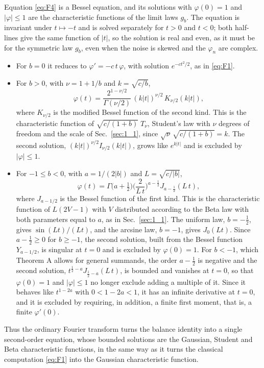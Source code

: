 \documentclass[aip,jmp,preprint,onecolumn,floatfix,superscriptaddress,nofootinbib,11pt]{revtex4-2}
\theoremstyle{plain}
\theoremstyle{remark}
\numberwithin{equation}{section}
\begin{document}
Equation \eqref{eq:F4} is a Bessel equation, and its solutions with $\varphi(0)=1$ and $|\varphi|\le1$ are the characteristic functions of the limit laws $g_b$. The equation is invariant under $t\mapsto-t$ and is solved separately for $t>0$ and $t<0$; both half-lines give the same function of $|t|$, so the solution is real and even, as it must be for the symmetric law $g_b$, even when the noise is skewed and the $\varphi_n$ are complex.
\begin{itemize}
\item For $b=0$ it reduces to $\varphi'=-c\,t\,\varphi$, with solution $e^{-ct^{2}/2}$, as in \eqref{eq:F1}.
\item For $b>0$, with $\nu=1+1/b$ and $k=\sqrt{c/b}$,
\begin{equation*}
\varphi(t)=\frac{2^{1-\nu/2}}{\Gamma(\nu/2)}\,(k|t|)^{\nu/2}\,K_{\nu/2}(k|t|),
\end{equation*}
where $K_{\nu/2}$ is the modified Bessel function of the second kind. This is the characteristic function of $\sqrt{c/(1+b)}\;T_\nu$, Student's law with $\nu$ degrees of freedom and the scale of Sec.~\ref{sec:1_1}, since $\sqrt\nu\,\sqrt{c/(1+b)}=k$. The second solution, $(k|t|)^{\nu/2}I_{\nu/2}(k|t|)$, grows like $e^{k|t|}$ and is excluded by $|\varphi|\le1$.
\item For $-1\le b<0$, with $a=1/(2|b|)$ and $L=\sqrt{c/|b|}$,
\begin{equation*}
\varphi(t)=\Gamma\big(a+\tfrac12\big)\Big(\frac{2}{L\,t}\Big)^{a-\frac12}J_{a-\frac12}(L\,t),
\end{equation*}
where $J_{a-1/2}$ is the Bessel function of the first kind. This is the characteristic function of $L(2V-1)$ with $V$ distributed according to the Beta law with both parameters equal to $a$, as in Sec.~\ref{sec:1_1}. The uniform law, $b=-\tfrac12$, gives $\sin(Lt)/(Lt)$, and the arcsine law, $b=-1$, gives $J_0(Lt)$. Since $a-\tfrac12\ge0$ for $b\ge-1$, the second solution, built from the Bessel function $Y_{a-1/2}$, is singular at $t=0$ and is excluded by $\varphi(0)=1$. For $b<-1$, which Theorem A allows for general summands, the order $a-\tfrac12$ is negative and the second solution, $t^{\frac12-a}J_{\frac12-a}(L\,t)$, is bounded and vanishes at $t=0$, so that $\varphi(0)=1$ and $|\varphi|\le1$ no longer exclude adding a multiple of it. Since it behaves like $t^{1-2a}$ with $0<1-2a<1$, it has an infinite derivative at $t=0$, and it is excluded by requiring, in addition, a finite first moment, that is, a finite $\varphi'(0)$.
\end{itemize}
Thus the ordinary Fourier transform turns the balance identity into a single second-order equation, whose bounded solutions are the Gaussian, Student and Beta characteristic functions, in the same way as it turns the classical computation \eqref{eq:F1} into the Gaussian characteristic function.
\end{document}
